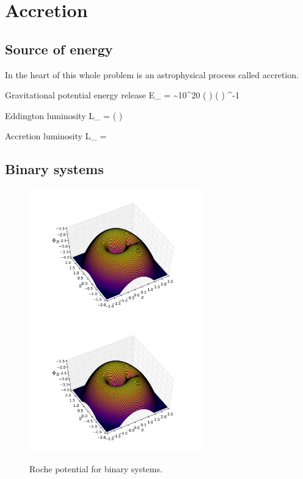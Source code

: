 \section{Accretion}

\subsection{Source of energy}
In the heart of this whole problem is an astrophysical process called accretion.

Gravitational potential energy release
\be
\Delta E_{} =  \sim 10^{20}  \left(  \right) \left(  \right) \unitspace\erg\unitspace\g^{-1}
\ee

Eddington luminosity
\be
L_{} =  \approx {} \left(  \right) \ergs
\ee

Accretion luminosity
\be
L_{} =  
\ee

\subsection{Binary systems}

\begin{figure}[t]
\centering
\includegraphics[width=7.5cm]{figs/astro/roche.pdf}
\includegraphics[width=7.5cm]{figs/astro/roche.pdf}
\caption{\label{fig:roche}
Roche potential for binary systems.
}
\end{figure}

